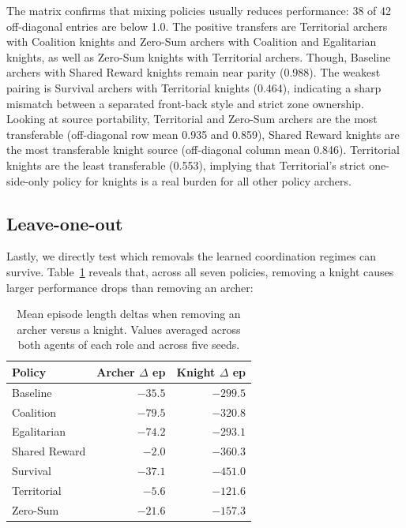 The matrix confirms that mixing policies usually reduces performance: 38 of 42 off-diagonal entries are below 1.0. The positive transfers are Territorial archers with Coalition knights and Zero-Sum archers with Coalition and Egalitarian knights, as well as Zero-Sum knights with Territorial archers. Though, Baseline archers with Shared Reward knights remain near parity (0.988). The weakest pairing is Survival archers with Territorial knights (0.464), indicating a sharp mismatch between a separated front-back style and strict zone ownership. Looking at source portability, Territorial and Zero-Sum archers are the most transferable (off-diagonal row mean 0.935 and 0.859), Shared Reward knights are the most transferable knight source (off-diagonal column mean 0.846). Territorial knights are the least transferable (0.553), implying that Territorial's strict one-side-only policy for knights is a real burden for all other policy archers. 

\subsection{Leave-one-out}
Lastly, we directly test which removals the learned coordination regimes can survive. Table~\ref{tab:loo-role-impact} reveals that, across all seven policies, removing a knight causes larger performance drops than removing an archer:

\begin{table}[H]
\centering
\small
\begin{tabular}{lrr}
\toprule
\textbf{Policy} & \textbf{Archer $\Delta$ ep} & \textbf{Knight $\Delta$ ep} \\
\midrule
Baseline & $-35.5$ & $-299.5$ \\
Coalition & $-79.5$ & $-320.8$ \\
Egalitarian & $-74.2$ & $-293.1$ \\
Shared Reward & $-2.0$ & $-360.3$ \\
Survival & $-37.1$ & $-451.0$ \\
Territorial & $-5.6$ & $-121.6$ \\
Zero-Sum & $-21.6$ & $-157.3$ \\
\bottomrule
\end{tabular}
\caption[Leave-one-out impact by role]{Mean episode length deltas when removing an archer versus a knight. Values averaged across both agents of each role and across five seeds.}
\label{tab:loo-role-impact}
\end{table}

